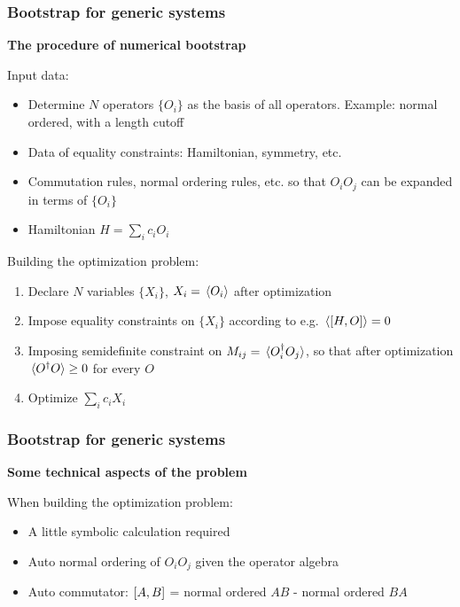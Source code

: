 \documentclass{beamer}
\begin{document}
\begin{frame}
\frametitle{Bootstrap for generic systems}

\textbf{The procedure of numerical bootstrap}   

Input data:
\begin{itemize}
    \item Determine $N$ operators $\{O_i\}$ as the basis of all operators.
    Example: normal ordered, with a length cutoff 
    \item Data of equality constraints: Hamiltonian, symmetry, etc.
    \item Commutation rules, normal ordering rules, etc. so that $O_i O_j$ can be expanded in terms of $\{O_i\}$
    \item Hamiltonian $H = \sum_i c_i O_i$
\end{itemize}

Building the optimization problem:
\begin{enumerate}
    \item Declare $N$ variables $\{X_i\}$, $X_i = \expval*{O_i}$ after optimization
    \item Impose equality constraints on $\{X_i\}$ according to e.g. $\expval*{\comm{H}{O}} = 0$ 
    \item Imposing semidefinite constraint on $M_{ij} = \expval*{O_i^\dagger O_j}$, so that after optimization $\expval*{O^\dagger O} \geq 0$ for every $O$
    \item Optimize $\sum_i c_i X_i$
\end{enumerate}

\end{frame}

\begin{frame}
\frametitle{Bootstrap for generic systems}

\textbf{Some technical aspects of the problem}

When building the optimization problem: 
\begin{itemize}
    \item A little symbolic calculation required
    \item Auto normal ordering of $O_i O_j$ given the operator algebra
    \item Auto commutator: $\comm{A}{B}$ = normal ordered $AB$ - normal ordered $BA$ 
\end{itemize}

\end{frame}
\end{document}
